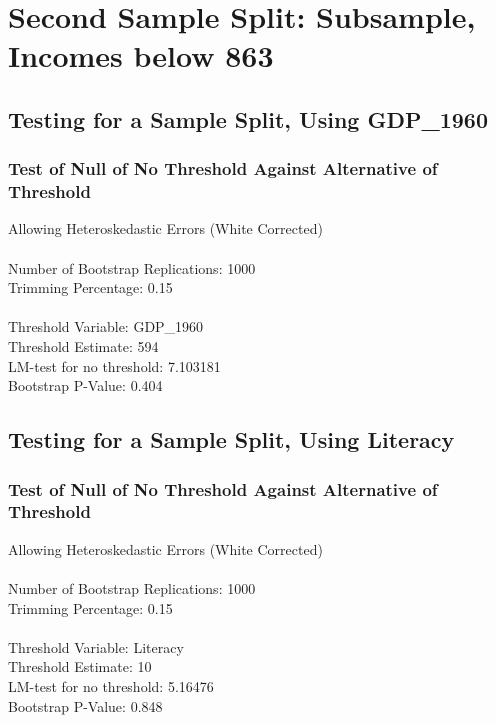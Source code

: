 \section{Second Sample Split: Subsample, Incomes below 863}

\subsection{Testing for a Sample Split, Using GDP\_1960} 
\subsubsection*{Test of Null of No Threshold Against Alternative of Threshold} 
Allowing Heteroskedastic Errors (White Corrected) \\\\
Number of Bootstrap Replications:  1000 \\
Trimming Percentage:               0.15 \\\\
Threshold Variable:                 GDP\_1960 \\
Threshold Estimate:                594 \\
LM-test for no threshold:          7.103181 \\
Bootstrap P-Value:                 0.404 \\

\subsection{Testing for a Sample Split, Using Literacy} 
\subsubsection*{Test of Null of No Threshold Against Alternative of Threshold} 
Allowing Heteroskedastic Errors (White Corrected) \\\\
Number of Bootstrap Replications:  1000 \\
Trimming Percentage:               0.15 \\\\
Threshold Variable:                 Literacy \\
Threshold Estimate:                10 \\
LM-test for no threshold:          5.16476 \\
Bootstrap P-Value:                 0.848 \\

